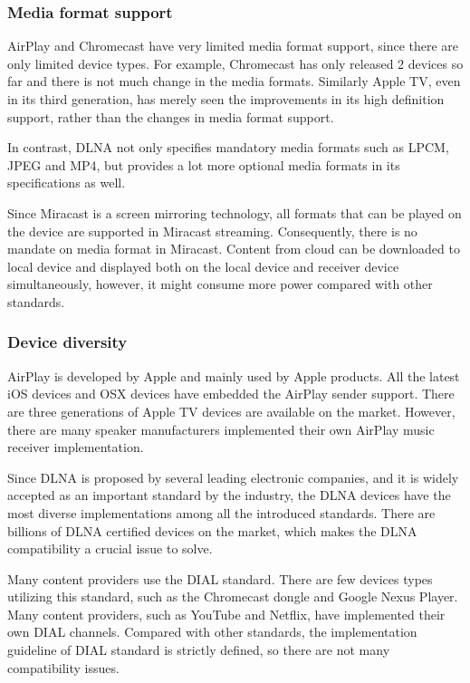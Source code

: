 \subsubsection{Media format support\label{2_3_3_1}} 
AirPlay and Chromecast have very limited media format support, since there are 
only limited device types. For example, Chromecast has only released 2 devices
so far and there is not much change in the media formats. Similarly Apple TV,
even in its third generation,  has merely seen the improvements in its high
definition support, rather than the changes in media format support.

In contrast, DLNA not only specifies mandatory media formats such as LPCM, JPEG
and MP4, but provides a lot more optional media formats in its specifications
as well.

Since Miracast is a screen mirroring technology, all formats that can be played
on the device are supported in Miracast streaming. Consequently, there is no
mandate on media format in Miracast. Content from
cloud can be downloaded to local device and displayed both on the local device
and receiver device simultaneously, however, it might consume more power
compared with other standards. 
\subsubsection{Device diversity\label{2_3_3_3}}
AirPlay is developed by Apple and mainly used by Apple products. All the latest
iOS devices and OSX devices have embedded the AirPlay sender support. There are
three generations of Apple TV devices are available on the market. However,
there are many speaker manufacturers implemented their own AirPlay music
receiver implementation.

Since DLNA is proposed by several leading electronic companies, and it is
widely accepted as an important standard by the industry, the DLNA devices have
the most diverse implementations among all the introduced standards. There are
billions of DLNA certified devices on the market, which makes the DLNA
compatibility a crucial issue to solve.

Many content providers use the DIAL standard. There are few devices types
utilizing this standard, such as the Chromecast dongle and Google Nexus Player.
Many content providers, such as YouTube and Netflix, have implemented their own
DIAL channels. Compared with other standards, the implementation guideline of
DIAL standard is strictly defined, so there are not many compatibility issues.

